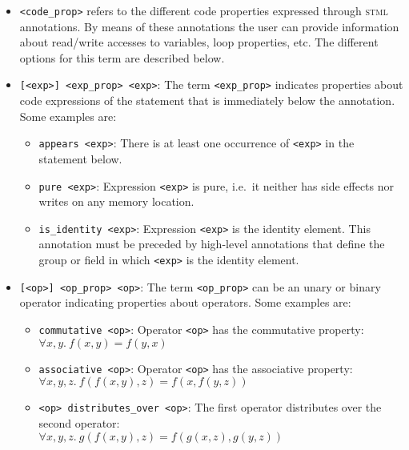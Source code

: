 \documentclass[svgnames,usenames,preprint,nocopyrightspace]{sigplanconf}
\newcommand{\jmcommin}[1]{\todo[inline,color=blue!20,bordercolor=blue,linecolor=blue,size=\scriptsize, caption={}]{JM: #1}}
\newcommand{\stml}{\textsc{stml}\xspace}
\begin{document}
\begin{itemize}
\item \lstinline{<code_prop>} refers to the different code properties
  expressed through \stml annotations. By means of these annotations
  the user can provide information about read/write accesses to
  variables, loop properties, etc. The different options for this term
  are described below.  
  \jmcommin{examples?}

\item{\lstinline{[<exp>] <exp_prop> <exp>}:} The term
  \lstinline{<exp_prop>} indicates
  properties about code expressions of the statement that is
  immediately below the annotation. Some examples are: 

\begin{itemize}
\item{\lstinline{appears <exp>}}: There is at least one occurrence of
  \lstinline{<exp>} in the statement below.

\item{\lstinline{pure <exp>}}: Expression \lstinline{<exp>} is pure,
  i.e.\ it neither has side effects nor writes on any memory location.

\item{\lstinline{is_identity <exp>}}: Expression \lstinline{<exp>} is
  the identity element. This annotation must be preceded by
  high-level annotations that define the group or field in which
  \lstinline{<exp>} is the identity element.
\end{itemize}

\item{\lstinline{[<op>] <op_prop> <op>}:} The term
  \lstinline{<op_prop>} can be an unary or binary operator indicating
  properties about operators. Some examples are: 

\begin{itemize}
\item{\lstinline{commutative <op>}}: Operator \lstinline{<op>} has
  the commutative property: $\forall x, y .~ f(x,y) = f(y,x)$


\item{\lstinline{associative <op>}}: Operator \lstinline{<op>} has
  the associative property:
  $\forall x, y, z .~ f(f(x,y),z) = f(x,f(y,z))$

\item{\lstinline{<op> distributes_over <op>}}: The first operator
  distributes over the second operator:\\
  $\forall x, y, z .~ g(f(x,y),z) = f(g(x,z),g(y,z))$
\end{itemize}


\end{itemize}
\end{document}
